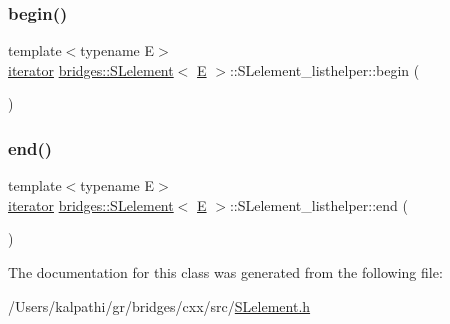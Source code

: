 \subsubsection{\texorpdfstring{begin()}{begin()}}
{\footnotesize\ttfamily template$<$typename E$>$ \\
\mbox{\hyperlink{classbridges_1_1_s_lelement_1_1_s_lelement__listhelper_1_1iterator}{iterator}} \mbox{\hyperlink{classbridges_1_1_s_lelement}{bridges\+::\+S\+Lelement}}$<$ \mbox{\hyperlink{namespacebridges_acfb0a4f7877d8f63de3e6862004c50eda3a3ea00cfc35332cedf6e5e9a32e94da}{E}} $>$\+::S\+Lelement\+\_\+listhelper\+::begin (\begin{DoxyParamCaption}{ }\end{DoxyParamCaption})\hspace{0.3cm}{\ttfamily [inline]}}

\mbox{\label{classbridges_1_1_s_lelement_1_1_s_lelement__listhelper_ac3adfea9337ba2f237a667794e41a975}} 
\subsubsection{\texorpdfstring{end()}{end()}}
{\footnotesize\ttfamily template$<$typename E$>$ \\
\mbox{\hyperlink{classbridges_1_1_s_lelement_1_1_s_lelement__listhelper_1_1iterator}{iterator}} \mbox{\hyperlink{classbridges_1_1_s_lelement}{bridges\+::\+S\+Lelement}}$<$ \mbox{\hyperlink{namespacebridges_acfb0a4f7877d8f63de3e6862004c50eda3a3ea00cfc35332cedf6e5e9a32e94da}{E}} $>$\+::S\+Lelement\+\_\+listhelper\+::end (\begin{DoxyParamCaption}{ }\end{DoxyParamCaption})\hspace{0.3cm}{\ttfamily [inline]}}



The documentation for this class was generated from the following file\+:\begin{DoxyCompactItemize}
\item 
/\+Users/kalpathi/gr/bridges/cxx/src/\mbox{\hyperlink{_s_lelement_8h}{S\+Lelement.\+h}}\end{DoxyCompactItemize}
